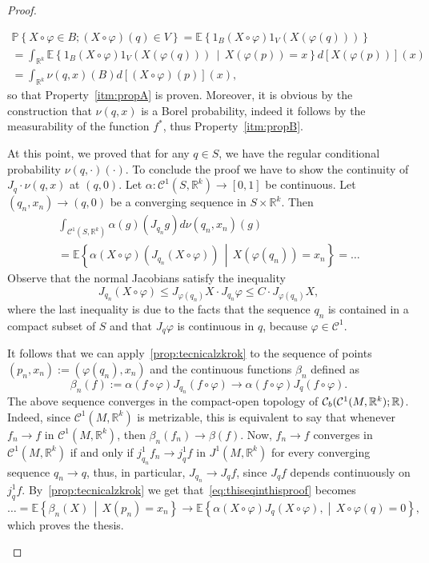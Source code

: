 \documentclass[AHL, Unicode, longabstracts, published]{cedram}
\newcommand{\R}{\mathbb{R}}
\newcommand{\PP}{\mathbb{P}}
\newcommand{\EE}{\mathbb{E}}
\newcommand{\mC}{\mathcal{C}}
\newcommand{\f}{\varphi}
\renewcommand{\a}{\alpha}
\begin{document}
\begin{proof}
\begin{enumerate}
\begin{multline}
\PP\left\{X\circ\f\in B; (X\circ\f)(q)\in V\right\} =
\EE\left\{1_B(X\circ \f) 1_V(X(\f(q)))\right\}
\\
=
\int_{\R^k}
\EE\left\{ 1_B(X\circ \f) 1_V(X(\f(q)))\,\middle|\,X(\f(p))=x\right\} d[X(\f(p))](x)
\\
=
\int_{\R^k}
\nu(q,x)(B)d[(X\circ\f)(p)](x),
\end{multline}
so that Property~\eqref{itm:propA} is proven. Moreover, it is obvious by the construction that $\nu(q,x)$ is a Borel probability, indeed it follows by the measurability of the function $f^*$, thus Property~\eqref{itm:propB}.

At this point, we proved that for any $q\in S$, we have the regular conditional probability $\nu(q,\cdot)(\cdot)$. To conclude the proof we have to show the continuity of ${J_q\cdot\nu(q,x)}$ at $(q,0)$. Let $\a\colon \mC^1(S,\R^k)\to [0,1]$ be continuous. Let $(q_n,x_n)\to (q,0)$ be a converging sequence in $S\times \R^k$. Then
\begin{multline}\label{eq:thiseqinthisproof}
\int_{\mC^1(S,\R^k)}\a (g)(J_{q_n} g) d\nu(q_n,x_n)(g)\\
=\EE\left\{ \a(X\circ \f)\left( J_{q_n}(X\circ\f)\right)\,\middle|\,X(\f(q_n))=x_n\right\}
=\dots
\end{multline}
Observe that the normal Jacobians satisfy the inequality
\begin{equation*}
J_{q_n}(X\circ\f)\le J_{\f(q_n)}X\cdot J_{q_n}\f\le C\cdot J_{\f(q_n)}X,
\end{equation*}
where the last inequality is due to the facts that the sequence ${q_n}$ is contained in a compact subset of $S$ and that $J_q\f$ is continuous in $q$, because $\f\in\mC^1$.

It follows that we can apply~\cref{prop:tecnicalzkrok} to the sequence of points $(p_n,x_n):=(\f(q_n),x_n)$ and the continuous functions $\beta_n$ defined as
\begin{equation*}
\beta_n(f):=\a\left( f\circ\f\right) J_{q_n}(f\circ\f)\to \a(f\circ\f)J_q(f\circ \f).
\end{equation*}
The above sequence converges in the compact-open topology of $\mC_b(\mC^1(M,\R^k);\linebreak \R)$. Indeed, since $\mC^1(M,\R^k)$ is metrizable, this is equivalent to say that whenever $f_n\to f$ in $\mC^1(M,\R^k)$, then $\beta_n(f_n)\to\beta(f)$. Now, $f_n\to f$ converges in $\mC^1(M,\R^k)$ if and only if $j^1_{q_n}f_n\to j^1_qf$ in $J^1(M,\R^k)$ for every converging sequence $q_n\to q$, thus, in particular, $J_{q_n}\to J_qf$, since $J_qf$ depends continuously on $j^1_qf$. By~\cref{prop:tecnicalzkrok} we get that~\eqref{eq:thiseqinthisproof} becomes
\begin{equation*}
\dots =\EE\left\{\beta_n(X)\,\middle|\,X(p_n)=x_n\right\}\to \EE\left\{\a(X\circ \f)J_q(X\circ\f),\middle|\,X\circ\f(q)=0\right\},
\end{equation*}
which proves the thesis.\qedhere
\end{enumerate}\let\qed\relax
\end{proof}
\end{document}
